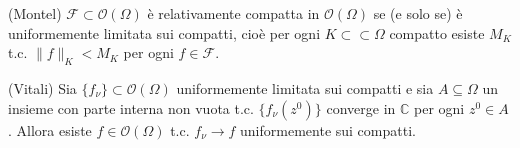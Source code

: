 \begin{thm}
  (Montel) $\mathcal{F} \subset \mathcal{O}(\Omega)$ è relativamente compatta in $\mathcal{O}(\Omega)$ se (e solo se) è uniformemente limitata sui compatti, cioè per ogni $K \subset\subset \Omega$ compatto esiste $M_K$ t.c. $\|f\|_K<M_K$ per ogni $f \in \mathcal{F}$.
\end{thm}

\begin{thm}
  (Vitali) Sia $\{f_{\nu}\} \subset \mathcal{O}(\Omega)$ uniformemente limitata sui compatti e sia $A \subseteq \Omega$ un insieme con parte interna non vuota t.c. $\{f_{\nu}(z^0)\}$ converge in $\mathbb{C}$ per ogni $z^0 \in A$. Allora esiste $f \in \mathcal{O}(\Omega)$ t.c. $f_{\nu} \longrightarrow f$ uniformemente sui compatti.
\end{thm}
